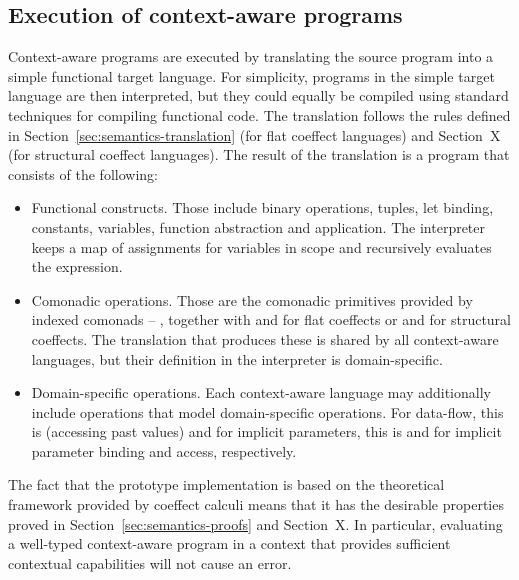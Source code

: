 
\subsection{Execution of context-aware programs}
\label{sec:impl-theory-transl}

Context-aware programs are executed by translating the source program into a simple functional
target language. For simplicity, programs in the simple target language are then interpreted, but
they could equally be compiled using standard techniques for compiling functional code. The
translation follows the rules defined in Section~\ref{sec:semantics-translation} (for flat coeffect
languages) and Section~X (for structural coeffect languages). The result of the translation is a
program that consists of the following:

\begin{itemize}
\item {\sc Functional constructs.} Those include binary operations, tuples, let binding,
  constants, variables, function abstraction and application. The interpreter keeps a map of
  assignments for variables in scope and recursively evaluates the expression.

\item {\sc Comonadic operations.} Those are the comonadic primitives provided by indexed comonads --
  ,  together with  and  for flat coeffects
  or  and  for structural coeffects. The translation that produces these
  is shared by all context-aware languages, but their definition in the interpreter is
  domain-specific.

\item {\sc Domain-specific operations.} Each context-aware language may additionally include
  operations that model domain-specific operations. For data-flow, this is  (accessing
  past values) and for implicit parameters, this is  and  for implicit
  parameter binding and access, respectively.
\end{itemize}

\noindent
The fact that the prototype implementation is based on the theoretical framework provided by
coeffect calculi means that it has the desirable properties proved in Section~\ref{sec:semantics-proofs}
and Section~X. In particular, evaluating a well-typed context-aware program in a context that
provides sufficient contextual capabilities will not cause an error.

